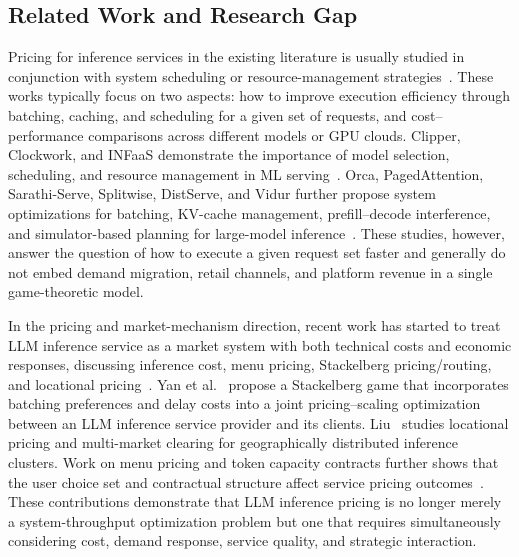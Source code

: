 \documentclass[11pt,a4paper]{article}
\begin{document}
\subsection{Related Work and Research Gap}
\label{sec:related_work}

Pricing for inference services in the existing literature is usually studied in conjunction with system scheduling or resource-management strategies~\cite{crankshaw2017clipper,yu2022orca,kwon2023pagedattention}. These works typically focus on two aspects: how to improve execution efficiency through batching, caching, and scheduling for a given set of requests, and cost--performance comparisons across different models or GPU clouds. Clipper, Clockwork, and INFaaS demonstrate the importance of model selection, scheduling, and resource management in ML serving~\cite{crankshaw2017clipper,gujarati2020clockwork,romero2021infaas}. Orca, PagedAttention, Sarathi-Serve, Splitwise, DistServe, and Vidur further propose system optimizations for batching, KV-cache management, prefill--decode interference, and simulator-based planning for large-model inference~\cite{yu2022orca,kwon2023pagedattention,agrawal2024sarathiserve,patel2024splitwise,zhong2024distserve,agrawal2024vidur}. These studies, however, answer the question of how to execute a given request set faster and generally do not embed demand migration, retail channels, and platform revenue in a single game-theoretic model.

In the pricing and market-mechanism direction, recent work has started to treat LLM inference service as a market system with both technical costs and economic responses, discussing inference cost, menu pricing, Stackelberg pricing/routing, and locational pricing~\cite{demirer2025emerging,erdil2025inference,bergemann2025menu,guo2026prillm,yan2026stackelberg,liu2026locational}. Yan et al.~\cite{yan2026stackelberg} propose a Stackelberg game that incorporates batching preferences and delay costs into a joint pricing--scaling optimization between an LLM inference service provider and its clients. Liu~\cite{liu2026locational} studies locational pricing and multi-market clearing for geographically distributed inference clusters. Work on menu pricing and token capacity contracts further shows that the user choice set and contractual structure affect service pricing outcomes~\cite{bergemann2025menu,xing2026tokenfutures}. These contributions demonstrate that LLM inference pricing is no longer merely a system-throughput optimization problem but one that requires simultaneously considering cost, demand response, service quality, and strategic interaction.
\end{document}
